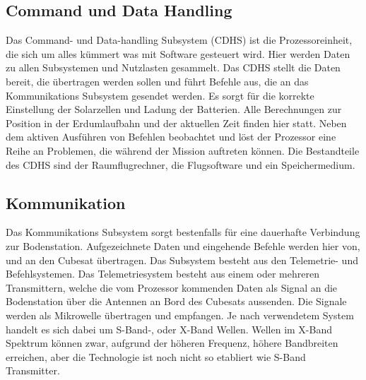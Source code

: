 		\subsection{Command und Data Handling}%
		
		Das Command- und Data-handling Subsystem (CDHS) ist die Prozessoreinheit, die sich um alles kümmert was mit Software gesteuert wird. Hier werden Daten zu allen Subsystemen und Nutzlasten gesammelt. Das CDHS stellt die Daten bereit, die übertragen werden sollen und führt Befehle aus, die an das Kommunikations Subsystem gesendet werden. 
Es sorgt für die korrekte Einstellung der Solarzellen und Ladung der Batterien. Alle Berechnungen zur Position in der Erdumlaufbahn und der aktuellen Zeit finden hier statt. Neben dem aktiven Ausführen von Befehlen beobachtet und löst der Prozessor eine Reihe an Problemen, die während der Mission auftreten können. Die Bestandteile des CDHS sind der Raumflugrechner, die Flugsoftware und ein Speichermedium.\cite{Lettau.}

		\subsection{Kommunikation}%
		
		Das Kommunikations Subsystem sorgt bestenfalls für eine dauerhafte Verbindung zur Bodenstation. Aufgezeichnete Daten und eingehende Befehle werden hier von, und an den Cubesat übertragen. Das Subsystem besteht aus den Telemetrie- und Befehlsystemen.
Das Telemetriesystem besteht aus einem oder mehreren Transmittern, welche die vom Prozessor kommenden Daten als Signal an die Bodenstation über die Antennen an Bord des Cubesats aussenden. Die Signale werden als Mikrowelle übertragen und empfangen. Je nach verwendetem System handelt es sich dabei um S-Band-, oder X-Band Wellen. Wellen im X-Band Spektrum können zwar, aufgrund der höheren Frequenz, höhere Bandbreiten erreichen, aber die Technologie ist noch nicht so etabliert wie S-Band Transmitter.\cite{Lettau.}
		
